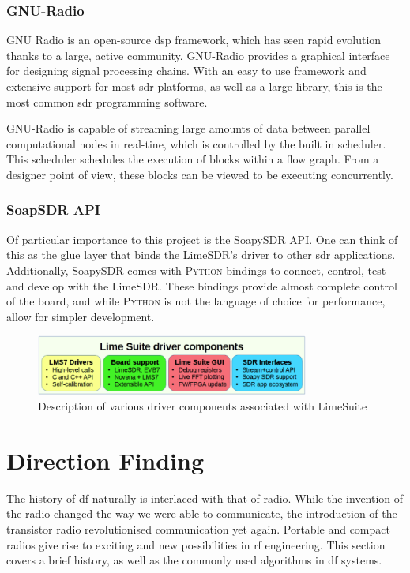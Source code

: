 \documentclass[class=report,11pt,crop=false]{standalone}
\begin{document}
\subsubsection{GNU-Radio}
GNU Radio is an open-source \gls{dsp} framework, which has seen rapid evolution thanks to a large, active community. GNU-Radio provides a graphical interface for designing signal processing chains. With an easy to use framework and extensive support for most \gls{sdr} platforms, as well as a large library, this is the most common \gls{sdr} programming software.

GNU-Radio is capable of streaming large amounts of data between parallel computational nodes in real-tine, which is controlled by the built in scheduler. This scheduler schedules the execution of blocks within a flow graph. From a designer point of view, these blocks can be viewed to be executing concurrently.

\subsubsection{SoapSDR API}
Of particular importance to this project is the SoapySDR \gls{API}. One can think of this as the glue layer that binds the LimeSDR's driver to other \gls{sdr} applications.
Additionally, SoapySDR comes with \textsc{Python} bindings to connect, control, test and develop with the LimeSDR. These bindings provide almost complete control of the board, and while \textsc{Python} is not the language of choice for performance, allow for simpler development. 

\begin{figure}
    \centering
    \includegraphics[width=0.8\textwidth]{Images/diagrams/LimeSuite.png}
    \caption{Description of various driver components associated with LimeSuite \cite{limesuite}}
    \label{fig:LimeSuite}
\end{figure}
\section{Direction Finding}
The history of \gls{df} naturally is interlaced with that of radio. While the invention of the radio changed the way we were able to communicate, the introduction of the transistor radio revolutionised communication yet again. Portable and compact radios give rise to exciting and new possibilities in \gls{rf} engineering. This section covers a brief history, as well as the commonly used algorithms in \gls{df} systems.
\end{document}
